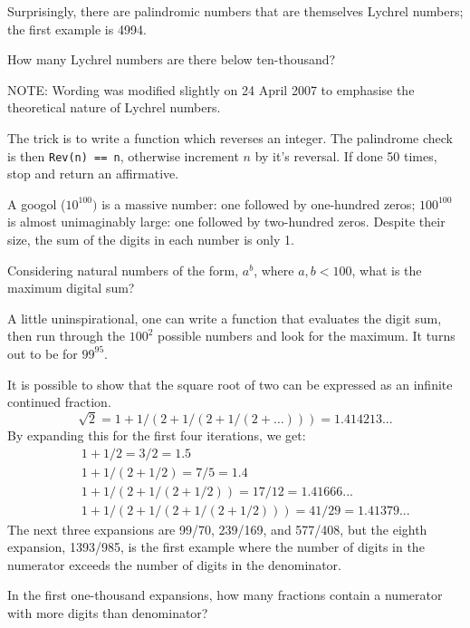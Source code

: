 Surprisingly, there are palindromic numbers that are themselves Lychrel numbers; the first example is 4994.

How many Lychrel numbers are there below ten-thousand?

\footnotesize
NOTE: Wording was modified slightly on 24 April 2007 to emphasise the theoretical nature of Lychrel numbers.

\normalsize
{}
The trick is to write a function which reverses an integer.  The palindrome check is then \verb"Rev(n) == n",
otherwise increment $n$ by it's reversal.  If done 50 times, stop and return an affirmative.




A googol ($10^{100})$ is a massive number: one followed by one-hundred zeros; $100^{100}$ is almost unimaginably large: one followed by two-hundred zeros. Despite their size, the sum of the digits in each number is only 1.

Considering natural numbers of the form, $a^{b}$, where $a, b < 100$, what is the maximum digital sum?

A little uninspirational, one can write a function that evaluates the digit sum, then run through the $100^2$ possible
numbers and look for the maximum.  It turns out to be for $99^{95}$.




It is possible to show that the square root of two can be expressed as an infinite continued fraction.
$$\sqrt2 = 1 + 1/(2 + 1/(2 + 1/(2 + \dots ))) = 1.414213...$$
By expanding this for the first four iterations, we get:
\begin{eqnarray*}
&&1 + 1/2     = 3/2 = 1.5\\
&&1 + 1/(2 + 1/2) = 7/5 = 1.4 \\
&&1 + 1/(2 + 1/(2 + 1/2)) = 17/12 = 1.41666... \\
&&1 + 1/(2 + 1/(2 + 1/(2 + 1/2))) = 41/29 = 1.41379...
\end{eqnarray*}
The next three expansions are 99/70, 239/169, and 577/408, but the eighth expansion, 1393/985, is the first example where the number of digits in the numerator exceeds the number of digits in the denominator.

In the first one-thousand expansions, how many fractions contain a numerator with more digits than denominator?

